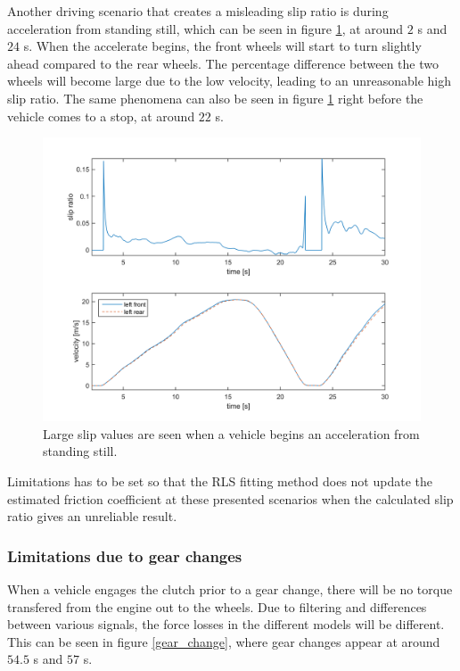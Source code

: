 Another driving scenario that creates a misleading slip ratio is during acceleration from standing still, which can be seen in figure \ref{slipratio_from_still}, at around $ 2 $ s and $ 24 $ s. When the accelerate begins, the front wheels will start to turn slightly ahead compared to the rear wheels. The percentage difference between the two wheels will become large due to the low velocity, leading to an unreasonable high slip ratio. The same phenomena can also be seen in figure \ref{slipratio_from_still} right before the vehicle comes to a stop, at around $ 22 $ s. 

\begin{figure}[h]
	\centering
	\includegraphics[width=1.0\textwidth]{Pictures/slipratio_from_still}
	\caption {Large slip values are seen when a vehicle begins an acceleration from standing still.}
	\label{slipratio_from_still}
\end{figure}

Limitations has to be set so that the RLS fitting method does not update the estimated friction coefficient at these presented scenarios when the calculated slip ratio gives an unreliable result.

\subsubsection{Limitations due to gear changes}
\label{sec:gearchange}
When a vehicle engages the clutch prior to a gear change, there will be no torque transfered from the engine out to the wheels. Due to filtering and differences between various signals, the force losses in the different models will be different. This can be seen in figure \ref{gear_change}, where gear changes appear at around $ 54.5 $ s and $ 57 $ s.


